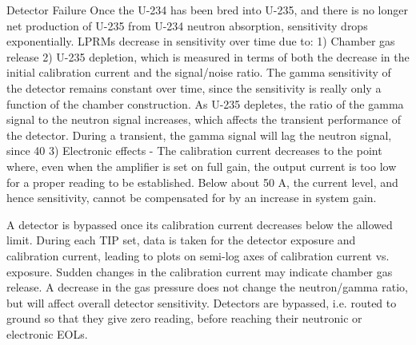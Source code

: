 \documentclass[10pt]{article}
\begin{document}
Detector Failure
Once the U-234 has been bred into U-235, and there is no longer net production of U-235 from U-234 neutron absorption, sensitivity drops exponentially. LPRMs decrease in sensitivity over time due to:
1)	Chamber gas release	
2)	U-235 depletion, which is measured in terms of both the decrease in the initial calibration current and the signal/noise ratio. The gamma sensitivity of the detector remains constant over time, since the sensitivity is really only a function of the chamber construction. As U-235 depletes, the ratio of the gamma signal to the neutron signal increases, which affects the transient performance of the detector. During a transient, the gamma signal will lag the neutron signal, since 40%
3)	Electronic effects - The calibration current decreases to the point where, even when the amplifier is set on full gain, the output current is too low for a proper reading to be established. Below about 50 A, the current level, and hence sensitivity, cannot be compensated for by an increase in system gain. 

A detector is bypassed once its calibration current decreases below the allowed limit. During each TIP set, data is taken for the detector exposure and calibration current, leading to plots on semi-log axes of calibration current vs. exposure. Sudden changes in the calibration current may indicate chamber gas release. A decrease in the gas pressure does not change the neutron/gamma ratio, but will affect overall detector sensitivity. Detectors are bypassed, i.e. routed to ground so that they give zero reading, before reaching their neutronic or electronic EOLs. 
\end{document}
